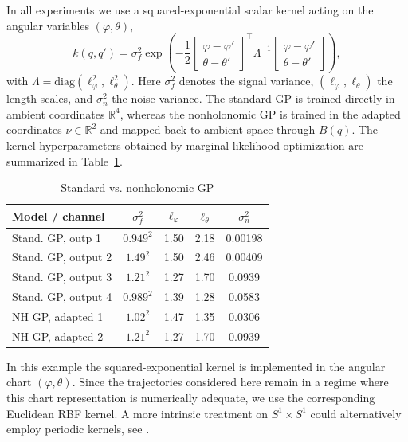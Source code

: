 \documentclass[letterpaper, 10 pt, conference]{ieeeconf}
\begin{document}
In all experiments we use a squared-exponential scalar kernel acting on the angular variables $(\varphi,\theta)$,
\begin{equation}
k(q,q')=\sigma_f^2
\exp\!\left(
-\frac12
\begin{bmatrix}
\varphi-\varphi'\\
\theta-\theta'
\end{bmatrix}^{\!\top}
\Lambda^{-1}
\begin{bmatrix}
\varphi-\varphi'\\
\theta-\theta'
\end{bmatrix}
\right),
\label{eq:scalar_kernel_num}
\end{equation}
with $\Lambda=\mathrm{diag}(\ell_\varphi^2,\ell_\theta^2)
$.  Here $\sigma_f^2$ denotes the signal variance, $(\ell_\varphi,\ell_\theta)$ the length scales, and $\sigma_n^2$ the noise variance. The standard GP is trained directly in ambient coordinates $\mathbb{R}^4$, whereas the nonholonomic GP is trained in the adapted coordinates $\nu\in\mathbb{R}^2$ and mapped back to ambient space through $B(q)$.  The kernel hyperparameters obtained by marginal likelihood optimization are summarized in Table~\ref{tab:vrd_hyperparameters}.
\begin{table}[h]
\centering
\begin{tabularx}{\textwidth}{lcccc}
\hline
Model / channel & $\sigma_f^2$ & $\ell_\varphi$ & $\ell_\theta$ & $\sigma_n^2$ \\
\hline
Stand. GP, outp 1 & $0.949^2$ & 1.50 & 2.18 & 0.00198 \\
Stand. GP, output 2 & $1.49^2$  & 1.50 & 2.46 & 0.00409 \\
Stand. GP, output 3 & $1.21^2$  & 1.27 & 1.70 & 0.0939 \\
Stand. GP, output 4 & $0.989^2$ & 1.39 & 1.28 & 0.0583 \\
NH GP, adapted 1      & $1.02^2$  & 1.47 & 1.35 & 0.0306 \\
NH GP, adapted 2      & $1.21^2$  & 1.27 & 1.70 & 0.0939 \\
\hline
\end{tabularx}
\caption{Standard vs. nonholonomic GP\label{tab:vrd_hyperparameters}}
\end{table}
In this example the squared-exponential kernel is implemented in the angular chart $(\varphi,\theta)$. Since the trajectories considered here remain in a regime where this chart representation is numerically adequate, we use the corresponding Euclidean RBF kernel. A more intrinsic treatment on $S^1\times S^1$ could alternatively employ periodic kernels, see \cite{rasmussen2006gaussian}.
\end{document}

